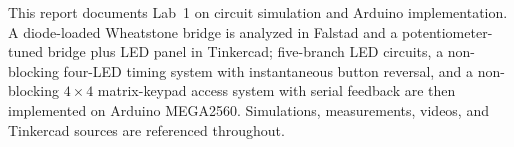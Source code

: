 This report documents Lab~1 on circuit simulation and Arduino implementation. A diode-loaded Wheatstone bridge is analyzed in Falstad and a potentiometer-tuned bridge plus LED panel in Tinkercad; five-branch LED circuits, a non-blocking four-LED timing system with instantaneous button reversal, and a non-blocking $4\times4$ matrix-keypad access system with serial feedback are then implemented on Arduino MEGA2560. Simulations, measurements, videos, and Tinkercad sources are referenced throughout.
